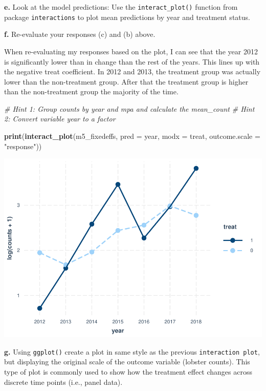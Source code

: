 \documentclass[
]{article}
\newenvironment{Shaded}{\begin{snugshade}}{\end{snugshade}}
\newcommand{\AttributeTok}[1]{\textcolor[rgb]{0.13,0.29,0.53}{#1}}
\newcommand{\CommentTok}[1]{\textcolor[rgb]{0.56,0.35,0.01}{\textit{#1}}}
\newcommand{\FunctionTok}[1]{\textcolor[rgb]{0.13,0.29,0.53}{\textbf{#1}}}
\newcommand{\NormalTok}[1]{#1}
\newcommand{\StringTok}[1]{\textcolor[rgb]{0.31,0.60,0.02}{#1}}
\begin{document}
\textbf{e.} Look at the model predictions: Use the
\texttt{interact\_plot()} function from package \texttt{interactions} to
plot mean predictions by year and treatment status.

\textbf{f.} Re-evaluate your responses (c) and (b) above.

When re-evaluating my responses based on the plot, I can see that the
year 2012 is significantly lower than in change than the rest of the
years. This lines up with the negative treat coefficient. In 2012 and
2013, the treatment group was actually lower than the non-treatment
group. After that the treatment group is higher than the non-treatment
group the majority of the time.

\begin{Shaded}
\begin{Highlighting}[]
\CommentTok{\# Hint 1: Group counts by \textasciigrave{}year\textasciigrave{} and \textasciigrave{}mpa\textasciigrave{} and calculate the \textasciigrave{}mean\_count\textasciigrave{}}
\CommentTok{\# Hint 2: Convert variable \textasciigrave{}year\textasciigrave{} to a factor}

\FunctionTok{print}\NormalTok{(}\FunctionTok{interact\_plot}\NormalTok{(m5\_fixedeffs, }\AttributeTok{pred =}\NormalTok{ year, }\AttributeTok{modx =}\NormalTok{ treat,}
              \AttributeTok{outcome.scale =} \StringTok{"response"}\NormalTok{))}
\end{Highlighting}
\end{Shaded}

\includegraphics{hw1-lobstrs-eds241_files/figure-latex/unnamed-chunk-23-1.pdf}

\textbf{g.} Using \texttt{ggplot()} create a plot in same style as the
previous \texttt{interaction\ plot}, but displaying the original scale
of the outcome variable (lobster counts). This type of plot is commonly
used to show how the treatment effect changes across discrete time
points (i.e., panel data).
\end{document}

